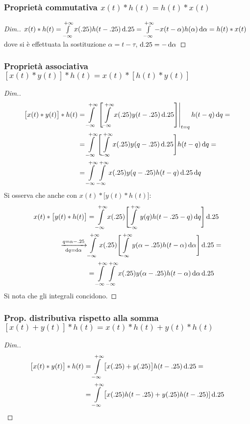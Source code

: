 \subsubsection{Proprietà commutativa $x(t)\ast h(t)= h(t)\ast x(t)$}
\begin{proof}[Dim.]
$x(t)\ast h(t)=\intinf{x(\tau)h(t-\tau)}{\tau}=\intinf{-x(t-\alpha)h(\alpha)}{\alpha}=h(t)\ast x(t)$ dove si è effettuata la sostituzione $\alpha=t-\tau$, $\diff\tau=-\diff\alpha$
\end{proof}
\subsubsection{Proprietà associativa $[x(t)\ast y(t)]\ast h(t)= x(t)\ast [h(t)\ast y(t)]$}
\begin{proof}[Dim.]
\begin{align*}
	\bigl[x(t) \ast y(t)\bigr] \ast h(t)
	&= \intinf{\bound{t=q}{}{\intinf{x(\tau)y(t-\tau)}{\tau}}h(t-q)}{q} = \\
	&= \intinf{\Biggl[\intinf{x(\tau)y(q-\tau)}{\tau}\Biggr]h(t-q)}{q} = \\
	&= \intinf{\intinf{x(\tau)y(q-\tau)h(t-q)}{\tau}}{q}
\end{align*}
Si osserva che anche con \(x(t) \ast \bigl[y(t) \ast h(t)\bigr]\):
\begin{align*}
	x(t) \ast \bigl[y(t) \ast h(t)\bigr]
	&= \intinf{x(\tau)\Biggl[\intinf{y(q)h(t-\tau-q)}{q}\Biggr]}{\tau} \\
	\xrightarrow[\mathrm{d}q=\mathrm{d}\alpha]{q=\alpha-\tau}
	& \intinf{x(\tau)\Biggl[\intinf{y(\alpha-\tau)h(t-\alpha)}{\alpha}\Biggr]}{\tau} = \\
	&= \intinf{\intinf{x(\tau)y(\alpha-\tau)h(t-\alpha)}{\alpha}}{\tau}
\end{align*}
Si nota che gli integrali concidono.
\end{proof}
\subsubsection{Prop. distributiva rispetto alla somma $[x(t)+y(t)]\ast h(t)= x(t)\ast h(t)+y(t)\ast h(t)$}
\begin{proof}[Dim.]
\begin{align*}
	\bigl[x(t) \ast y(t)\bigr] \ast h(t)
	&= \intinf{\bigl[x(\tau) + y(\tau)\bigr]h(t-\tau)}{\tau} = \\
	&= \intinf{\bigl[x(\tau)h(t-\tau)+y(\tau)h(t-\tau)]}{\tau}
	\qedhere
\end{align*}
\end{proof}

